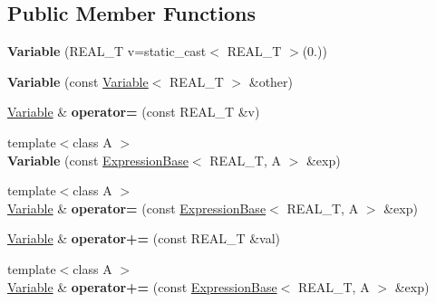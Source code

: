 \subsection*{Public Member Functions}
\begin{DoxyCompactItemize}
\item 
\hypertarget{structatl_1_1_variable_a0089f2d112ea67897ac2e23033686279}{{\bfseries Variable} (R\+E\+A\+L\+\_\+\+T v=static\+\_\+cast$<$ R\+E\+A\+L\+\_\+\+T $>$(0.))}\label{structatl_1_1_variable_a0089f2d112ea67897ac2e23033686279}

\item 
\hypertarget{structatl_1_1_variable_a64f472f5f036b681d9e9b35f3de96a1e}{{\bfseries Variable} (const \hyperlink{structatl_1_1_variable}{Variable}$<$ R\+E\+A\+L\+\_\+\+T $>$ \&other)}\label{structatl_1_1_variable_a64f472f5f036b681d9e9b35f3de96a1e}

\item 
\hypertarget{structatl_1_1_variable_a6237645a2e54443ec0c101d089c5f834}{\hyperlink{structatl_1_1_variable}{Variable} \& {\bfseries operator=} (const R\+E\+A\+L\+\_\+\+T \&v)}\label{structatl_1_1_variable_a6237645a2e54443ec0c101d089c5f834}

\item 
\hypertarget{structatl_1_1_variable_a900d049c0f459456bd19f2bdbbb76ab3}{{\footnotesize template$<$class A $>$ }\\{\bfseries Variable} (const \hyperlink{structatl_1_1_expression_base}{Expression\+Base}$<$ R\+E\+A\+L\+\_\+\+T, A $>$ \&exp)}\label{structatl_1_1_variable_a900d049c0f459456bd19f2bdbbb76ab3}

\item 
\hypertarget{structatl_1_1_variable_abfa1e5ed61daa1b25668f3afd1bfd125}{{\footnotesize template$<$class A $>$ }\\\hyperlink{structatl_1_1_variable}{Variable} \& {\bfseries operator=} (const \hyperlink{structatl_1_1_expression_base}{Expression\+Base}$<$ R\+E\+A\+L\+\_\+\+T, A $>$ \&exp)}\label{structatl_1_1_variable_abfa1e5ed61daa1b25668f3afd1bfd125}

\item 
\hypertarget{structatl_1_1_variable_aad8e1d6b2c5258b17020f8ee694ffb95}{\hyperlink{structatl_1_1_variable}{Variable} \& {\bfseries operator+=} (const R\+E\+A\+L\+\_\+\+T \&val)}\label{structatl_1_1_variable_aad8e1d6b2c5258b17020f8ee694ffb95}

\item 
\hypertarget{structatl_1_1_variable_a575ec695135b3abdcae2141434e87100}{{\footnotesize template$<$class A $>$ }\\\hyperlink{structatl_1_1_variable}{Variable} \& {\bfseries operator+=} (const \hyperlink{structatl_1_1_expression_base}{Expression\+Base}$<$ R\+E\+A\+L\+\_\+\+T, A $>$ \&exp)}\label{structatl_1_1_variable_a575ec695135b3abdcae2141434e87100}


\end{DoxyCompactItemize}
